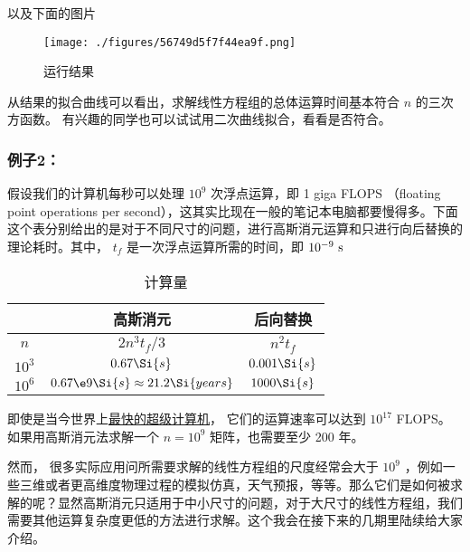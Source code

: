 以及下面的图片

\begin{figure}[ht]
\centering
\texttt{[image: ./figures/56749d5f7f44ea9f.png]}
\caption{运行结果} \label{fig_NLinEq_1}
\end{figure}

从结果的拟合曲线可以看出，求解线性方程组的总体运算时间基本符合 $n$ 的三次方函数。 有兴趣的同学也可以试试用二次曲线拟合，看看是否符合。

\subsubsection{例子2：}

假设我们的计算机每秒可以处理 $10^9$ 次浮点运算，即 1 giga FLOPS （floating point operations per second），这其实比现在一般的笔记本电脑都要慢得多。下面这个表分别给出的是对于不同尺寸的问题，进行高斯消元运算和只进行向后替换的理论耗时。其中， $t_f$ 是一次浮点运算所需的时间，即 $10^{-9}~\rm{s}$ 

\begin{table}[ht]
\centering
\caption{计算量}\label{tab_NLinEq_1}
\begin{tabular}{|c|c|c|}
\hline
 & 高斯消元 & 后向替换 \\
\hline
$n$ & $2n^3 t_f/3$ & $n^2 t_f$ \\
\hline
$10^3$ & $0.67\Si{s}$ & $0.001\Si{s}$ \\
\hline
$10^6$ & $0.67\e9\Si{s} \approx 21.2 \Si{years}$ & $1000\Si{s}$ \\
\hline
\end{tabular}
\end{table}

即使是当今世界上\href{https://www.top500.org}{最快的超级计算机}， 它们的运算速率可以达到 $10^{17}$ FLOPS。 如果用高斯消元法求解一个 $n=10^9$ 矩阵，也需要至少 200 年。

然而， 很多实际应用问所需要求解的线性方程组的尺度经常会大于 $10^9$ ，例如一些三维或者更高维度物理过程的模拟仿真，天气预报，等等。那么它们是如何被求解的呢？显然高斯消元只适用于中小尺寸的问题，对于大尺寸的线性方程组，我们需要其他运算复杂度更低的方法进行求解。这个我会在接下来的几期里陆续给大家介绍。
